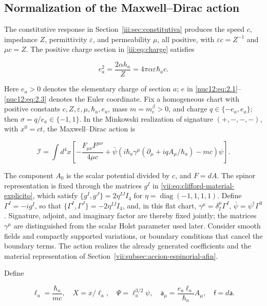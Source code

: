 \subsection{Normalization of the Maxwell--Dirac action}

The constitutive response in Section~\ref{iii:sec:constitutiva} produces the speed \(c\), impedance \(Z\), permittivity \(\varepsilon\), and permeability \(\mu\), all positive, with \(\varepsilon c=Z^{-1}\) and \(\mu c=Z\). The positive charge section in \eqref{iii:eq:charge} satisfies

\begin{equation}
e_a^2=\frac{2\alpha h_a}{Z}
=4\pi\alpha\varepsilon\hbar_a c .
\label{nuc12:eq:3.1}
\end{equation}

Here \(e_a>0\) denotes the elementary charge of section \(a\); \(e\) in \eqref{nuc12:eq:2.1}--\eqref{nuc12:eq:2.3} denotes the Euler coordinate. Fix a homogeneous chart with positive constants \(c,Z,\varepsilon,\mu,\hbar_a,e_a\), mass \(m=m_e^\beta>0\), and charge \(q\in\{-e_a,e_a\}\); then \(\sigma=q/e_a\in\{-1,1\}\). In the Minkowski realization of signature \((+,-,-,-)\), with \(x^0=ct\), the Maxwell--Dirac action is

\begin{equation}
\mathcal I=\int d^4x\left[
-\frac{F_{\mu\nu}F^{\mu\nu}}{4\mu c}
+\bar\psi\left(i\hbar_a\gamma^\mu
(\partial_\mu+iqA_\mu/\hbar_a)-mc\right)\psi
\right].
\label{nuc12:eq:3.2}
\end{equation}

The component \(A_0\) is the scalar potential divided by \(c\), and \(F=dA\). The spinor representation is fixed through the matrices \(g^I\) in \eqref{vii:eq:clifford-material-explicito}, which satisfy \(\{g^I,g^J\}=2\eta^{IJ}I_4\) for \(\eta=\operatorname{diag}(-1,1,1,1)\). Define \(\Gamma^I=-ig^I\), so that \(\{\Gamma^I,\Gamma^J\}=-2\eta^{IJ}I_4\), and, in this flat chart, \(\gamma^\mu=\delta^\mu_I\Gamma^I\), \(\bar\psi=\psi^\dagger\Gamma^0\). Signature, adjoint, and imaginary factor are thereby fixed jointly; the matrices \(\gamma^\mu\) are distinguished from the scalar Holst parameter used later. Consider smooth fields and compactly supported variations, or boundary conditions that cancel the boundary terms. The action realizes the already generated coefficients and the material representation of Section~\ref{vii:subsec:accion-espinorial-afin}.

Define

\[
\ell_a=\frac{\hbar_a}{mc},\quad X=x/\ell_a,\quad
\Psi=\ell_a^{3/2}\psi,\quad
\mathsf a_\mu=\frac{e_a\ell_a}{\hbar_a}A_\mu,\quad
\mathsf f=d\mathsf a.
\]


